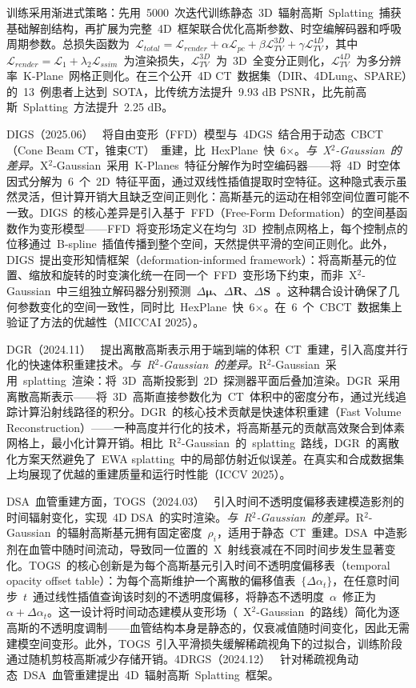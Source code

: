 训练采用渐进式策略：先用~5000~次迭代训练静态~3D~辐射高斯~Splatting~捕获基础解剖结构，再扩展为完整~4D~框架联合优化高斯参数、时空编解码器和呼吸周期参数。总损失函数为~$\mathcal{L}_{total} = \mathcal{L}_{render} + \alpha \mathcal{L}_{pc} + \beta \mathcal{L}_{TV}^{3D} + \gamma \mathcal{L}_{TV}^{4D}$，其中~$\mathcal{L}_{render} = \mathcal{L}_1 + \lambda_2 \mathcal{L}_{ssim}$~为渲染损失，$\mathcal{L}_{TV}^{3D}$~为~3D~全变分正则化，$\mathcal{L}_{TV}^{4D}$~为多分辨率~K-Plane~网格正则化。在三个公开~4D CT~数据集（DIR、4DLung、SPARE）的~13~例患者上达到~SOTA，比传统方法提升~9.93 dB PSNR，比先前高斯~Splatting~方法提升~2.25 dB。

DIGS（2025.06）~\cite{2506_22280} 将自由变形（FFD）模型与~4DGS~结合用于动态~CBCT（Cone Beam CT，锥束CT）~重建，比~HexPlane~快~6$\times$。\textit{与~X$^{2}$-Gaussian~的差异。}X$^{2}$-Gaussian~采用~K-Planes~特征分解作为时空编码器——将~4D~时空体因式分解为~6~个~2D~特征平面，通过双线性插值提取时空特征。这种隐式表示虽然灵活，但计算开销大且缺乏空间正则化：高斯基元的运动在相邻空间位置可能不一致。DIGS~的核心差异是引入基于~FFD（Free-Form Deformation）的空间基函数作为变形模型——FFD~将变形场定义在均匀~3D~控制点网格上，每个控制点的位移通过~B-spline~插值传播到整个空间，天然提供平滑的空间正则化。此外，DIGS~提出变形知情框架（deformation-informed framework）：将高斯基元的位置、缩放和旋转的时变演化统一在同一个~FFD~变形场下约束，而非~X$^{2}$-Gaussian~中三组独立解码器分别预测~$\Delta\bm{\mu}$、$\Delta\bm{R}$、$\Delta\bm{S}$~。这种耦合设计确保了几何参数变化的空间一致性，同时比~HexPlane~快~6$\times$。在~6~个~CBCT~数据集上验证了方法的优越性（MICCAI 2025）。

DGR（2024.11）~\cite{2411_04844} 提出离散高斯表示用于端到端的体积~CT~重建，引入高度并行化的快速体积重建技术。\textit{与~R$^{2}$-Gaussian~的差异。}R$^{2}$-Gaussian~采用~splatting~渲染：将~3D~高斯投影到~2D~探测器平面后叠加渲染。DGR~采用离散高斯表示——将~3D~高斯直接参数化为~CT~体积中的密度分布，通过光线追踪计算沿射线路径的积分。DGR~的核心技术贡献是快速体积重建（Fast Volume Reconstruction）——一种高度并行化的技术，将高斯基元的贡献高效聚合到体素网格上，最小化计算开销。相比~R$^{2}$-Gaussian~的~splatting~路线，DGR~的离散化方案天然避免了~EWA splatting~中的局部仿射近似误差。在真实和合成数据集上均展现了优越的重建质量和运行时性能（ICCV 2025）。

DSA~血管重建方面，TOGS（2024.03）~\cite{2403_19586} 引入时间不透明度偏移表建模造影剂的时间辐射变化，实现~4D DSA~的实时渲染。\textit{与~R$^{2}$-Gaussian~的差异。}R$^{2}$-Gaussian~的辐射高斯基元拥有固定密度~$\rho_i$，适用于静态~CT~重建。DSA~中造影剂在血管中随时间流动，导致同一位置的~X~射线衰减在不同时间步发生显著变化。TOGS~的核心创新是为每个高斯基元引入时间不透明度偏移表（temporal opacity offset table）：为每个高斯维护一个离散的偏移值表~$\{\Delta\alpha_t\}$，在任意时间步~$t$~通过线性插值查询该时刻的不透明度偏移，将静态不透明度~$\alpha$~修正为~$\alpha + \Delta\alpha_t$。这一设计将时间动态建模从变形场（~X$^{2}$-Gaussian~的路线）简化为逐高斯的不透明度调制——血管结构本身是静态的，仅衰减值随时间变化，因此无需建模空间变形。此外，TOGS~引入平滑损失缓解稀疏视角下的过拟合，训练阶段通过随机剪枝高斯减少存储开销。4DRGS（2024.12）~\cite{2412_12919} 针对稀疏视角动态~DSA~血管重建提出~4D~辐射高斯~Splatting~框架。

